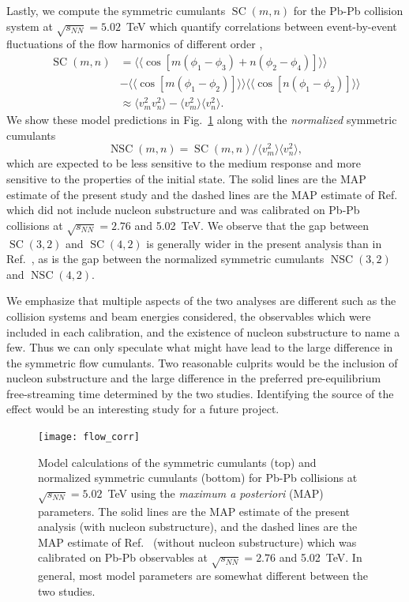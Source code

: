 \documentclass[aps,prc,reprint,amsmath,nofootinbib]{revtex4-1}
\newcommand{\sqrts}{\sqrt{s_{NN}}}
\DeclareMathOperator{\SC}{SC}
\DeclareMathOperator{\NSC}{NSC}
\begin{document}
Lastly, we compute the symmetric cumulants $\SC(m,n)$ for the Pb-Pb collision system at $\sqrts=5.02$~TeV which quantify correlations between event-by-event fluctuations of the flow harmonics of different order \cite{Bilandzic:2013kga, ALICE:2016kpq},
\begin{align}
  \SC(m, n) &= \langle\langle \cos[m(\phi_1 - \phi_3) + n(\phi_2-\phi_4)]\rangle\rangle \nonumber \\
  \nonumber &- \langle\langle\cos[m(\phi_1-\phi_2)]\rangle\rangle\langle\langle\cos[n(\phi_1-\phi_2)]\rangle\rangle \label{eq:scmn}\\
  &\approx \langle v_m^2 v_n^2 \rangle - \langle v_m^2\rangle\langle v_n^2\rangle.
\end{align}
We show these model predictions in Fig.~\ref{fig:flow_corr} along with the \emph{normalized} symmetric cumulants
\begin{equation}
  \NSC(m,n) = \SC(m,n)/\langle v_m^2\rangle\langle v_n^2\rangle,
\end{equation}
which are expected to be less sensitive to the medium response and more sensitive to the properties of the initial state.
The solid lines are the MAP estimate of the present study and the dashed lines are the MAP estimate of Ref.~\cite{Bernhard:2018hnz} which did not include nucleon substructure and was calibrated on Pb-Pb collisions at $\sqrts=2.76$ and 5.02~TeV.
We observe that the gap between $\SC(3,2)$ and $\SC(4,2)$ is generally wider in the present analysis than in Ref.~\cite{Bernhard:2018hnz}, as is the gap between the normalized symmetric cumulants $\NSC(3,2)$ and $\NSC(4,2)$.

We emphasize that multiple aspects of the two analyses are different such as the collision systems and beam energies considered, the observables which were included in each calibration, and the existence of nucleon substructure to name a few.
Thus we can only speculate what might have lead to the large difference in the symmetric flow cumulants.
Two reasonable culprits would be the inclusion of nucleon substructure and the large difference in the preferred pre-equilibrium free-streaming time determined by the two studies.
Identifying the source of the effect would be an interesting study for a future project.

\begin{figure}
  \texttt{[image: flow\_corr]}
  \caption{
    \label{fig:flow_corr}
    Model calculations of the symmetric cumulants (top) and normalized symmetric cumulants (bottom) for Pb-Pb collisions at $\sqrts=5.02$~TeV using the \emph{maximum a posteriori} (MAP) parameters.
    The solid lines are the MAP estimate of the present analysis (with nucleon substructure), and the dashed lines are the MAP estimate of Ref.~\cite{Bernhard:2018hnz} (without nucleon substructure) which was calibrated on Pb-Pb observables at $\sqrts=2.76$ and 5.02~TeV.
    In general, most model parameters are somewhat different between the two studies.
  }
\end{figure}
\end{document}
